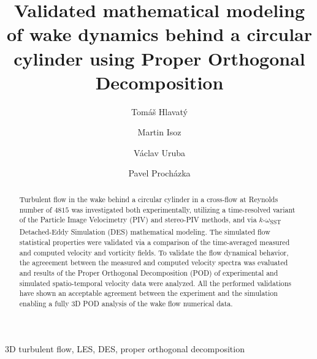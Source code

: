 \documentclass[number,review]{elsarticle}
\begin{document}
\begin{frontmatter}

\title
{
 Validated mathematical modeling of wake dynamics behind a circular cylinder using Proper Orthogonal Decomposition
}

\address[ITCAS]
{
 Institute of Thermomechanics of the Czech Academy of Sciences,
 Dolej\v{s}kova 5, Prague 182~00, Czech Republic
}

\address[CTU]
{
 Czech Technical University in Prague,
 Department of Technical Mathematics,
 Jugoslávských partyzánů 1580, Prague 160 00, Czech Republic
}

\address[VSCHTDM]
{
 University of~Chemistry and Technology, Prague,
 Department of~Mathematics,
 Technick\'{a}~5, Prague 166~28, Czech Republic
}




\address[ZCU]
{
 University of~West Bohemia, Pilsen,
 Department of Power System Engineering,
 Universitn\'{i}~8, Pilsen 301~00, Czech Republic
}


\author[ITCAS,CTU]{Tom\'{a}\v{s} Hlavat\'{y}}
\author[ITCAS,VSCHTDM]{Martin Isoz}
\author[ITCAS,ZCU]{V\'{a}clav Uruba}
\author[ITCAS]{Pavel Proch\'{a}zka}


\begin{abstract}
{Turbulent flow in the wake behind a circular cylinder in a cross-flow at Reynolds number of $4815$ was investigated both experimentally, utilizing a time-resolved variant of the Particle Image Velocimetry (PIV) and stereo-PIV methods, and via $k$-$\omega$\textsubscript{SST} Detached-Eddy Simulation (DES) mathematical modeling. The simulated flow statistical properties were validated via a comparison of the time-averaged measured and computed velocity and vorticity fields. To validate the flow dynamical behavior, the agreeement between the measured and computed velocity spectra was evaluated and results of the Proper Orthogonal Decomposition (POD) of experimental and simulated spatio-temporal velocity data were analyzed. All the performed validations have shown an acceptable agreement between the experiment and the simulation enabling a fully 3D POD analysis of the wake flow numerical data.}
\end{abstract}

\begin{keyword}
3D turbulent flow\sep
LES\sep
DES\sep 
proper orthogonal decomposition
\end{keyword}

\end{frontmatter}
\end{document}
